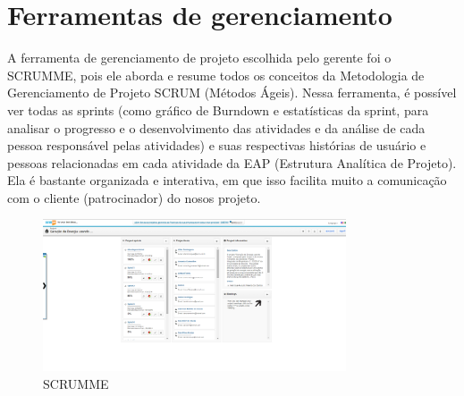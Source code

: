 \section{Ferramentas de gerenciamento}

A ferramenta de gerenciamento de projeto escolhida pelo gerente foi o SCRUMME, pois ele aborda e resume todos os conceitos da Metodologia de Gerenciamento de Projeto SCRUM (Métodos Ágeis). Nessa ferramenta, é possível ver todas as sprints (como gráfico de Burndown e estatísticas da sprint, para analisar o progresso e o desenvolvimento das atividades e da análise de cada pessoa responsável pelas atividades) e suas respectivas histórias de usuário e pessoas relacionadas em cada atividade da EAP (Estrutura Analítica de Projeto). Ela é bastante organizada e interativa, em que isso facilita muito a comunicação com o cliente (patrocinador) do nosos projeto.

\begin{figure}[p]
    \centering
    \includegraphics[width=0.8\textwidth]{figuras/scrumme1.png}
    \caption{SCRUMME}
    \label{fig:scrumme}
\end{figure} 
